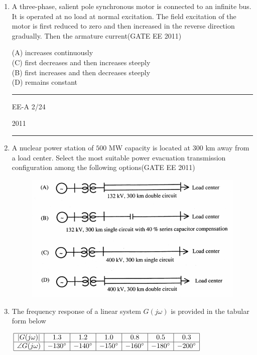 \documentclass[a4paper,10pt]{exam}
\theoremstyle{remark}
\begin{document}
\begin{enumerate}
\item \quad A three-phase, salient pole synchronous motor is connected to an infinite bus. It is operated at no load at normal excitation. The field excitation of the motor is first reduced to zero and then increased in the reverse direction gradually. Then the armature current\hfill{(GATE EE 2011)}

\begin{multicols}{2}
(A) increases continuously \\
(C) first decreases and then increases steeply \\[2ex]
(B) first increases and then decreases steeply \\

(D) remains constant
\end{multicols}
\vspace{1cm}
\noindent\rule{\textwidth}{0.4pt}
\raggedright{EE-A}
\hfill
2/24
\newpage
\raggedright{2011}
\hfill
{}\\

\noindent\rule{\textwidth}{0.4pt}

\item \quad A nuclear power station of $500$ MW capacity is located at $300$ km away from a load center. Select the most suitable power evacuation transmission configuration among the following options\hfill{(GATE EE 2011)}

\begin{figure}[H]
    \centering
    \includegraphics[width=0.7\columnwidth]{figs/Q 7.png}
\end{figure}

\item \quad The frequency response of a linear system $G(j\omega)$ is provided in the tabular form below

$
\begin{array}{|c|c|c|c|c|c|c|c|}
\hline
|G(j\omega)| & 1.3 & 1.2 & 1.0 & 0.8 & 0.5 & 0.3 \\
\hline
\angle G(j\omega) & -130^\circ & -140^\circ & -150^\circ & -160^\circ & -180^\circ & -200^\circ \\
\hline
\end{array}
$


\end{enumerate}
\end{document}
